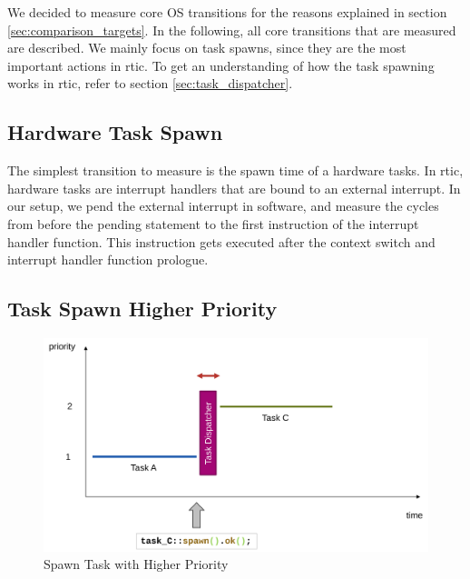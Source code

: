 We decided to measure core OS transitions for the reasons explained in section \ref{sec:comparison_targets}. In the following, all core transitions that are measured are described. We mainly focus on task spawns, since they are the most important actions in \gls{rtic}. To get an understanding of how the task spawning works in \gls{rtic}, refer to section \ref{sec:task_dispatcher}.

\subsection{Hardware Task Spawn}

The simplest transition to measure is the spawn time of a hardware tasks. In \gls{rtic}, hardware tasks are interrupt handlers that are bound to an external interrupt. In our setup, we pend the external interrupt in software, and measure the cycles from before the pending statement to the first instruction of the interrupt handler function. This instruction gets executed after the context switch and interrupt handler function prologue.

\subsection{Task Spawn Higher Priority}

\begin{figure}
  \centerfloat
  \includegraphics[width=\textwidth]{fig/spawn_prio_high.svg.pdf}
  \caption{Spawn Task with Higher Priority}%
  \label{fig:spawn_prio_high}
\end{figure}

